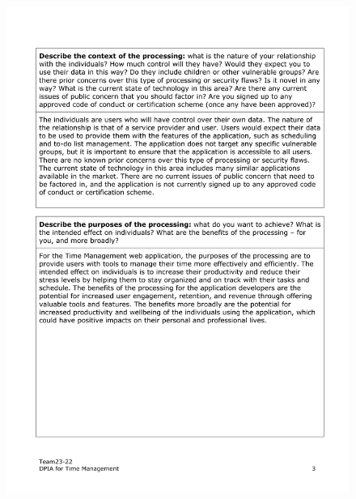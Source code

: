\documentclass[a4paper]{article}
\begin{document}
\begin{figure}[H]
	\centering
	\includegraphics[width=1\textwidth]{./images/DPIA-Team23-22/DPIA-Team23-22_3.pdf}
	\label{Fig.DPIA_3}
\end{figure}
\end{document}
